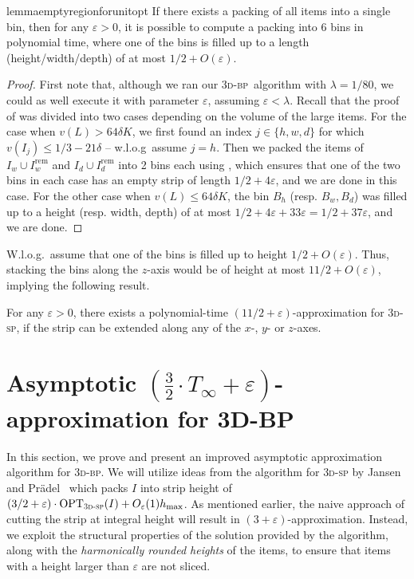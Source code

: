 \documentclass[a4paper,UKenglish,cleveref, autoref, thm-restate]{lipics-v2021}
\newcommand{\eps}{\varepsilon}
\newcommand{\opt}{\mathrm{OPT}}
\newcommand{\tbp}{\textsc{3d-bp}\xspace}
\newcommand{\tsp}{\textsc{3d-sp}\xspace}
\begin{document}
\begin{restatable}{lemma}{emptyregionforunitopt}
\label{lem:emptyregionforunitopt}
    If there exists a packing of all items into a single bin, then for any $\varepsilon >0$, it is possible to compute a packing into 6 bins in polynomial time, where one of the bins is filled up to a length (height/width/depth) of at most $1/2+O(\varepsilon)$.
\end{restatable}
\begin{proof}
    First note that, although we ran our \tbp~algorithm with $\lambda = 1/80$, we could as well execute it with parameter $\eps$, assuming $\eps < \lambda$. Recall that the proof of  was divided into two cases depending on the volume of the large items. For the case when $v(L)>64\delta K$, we first found an index $j\in \{h,w,d\}$ for which $v(I_j) \le 1/3-21\delta$ -- w.l.o.g~assume $j=h$. Then we packed the items of $I_w \cup I_w^{\text{rem}}$ and $I_d \cup I_d^{\text{rem}}$ into 2 bins each using , which ensures that one of the two bins in each case has an empty strip of length $1/2+4\eps$, and we are done in this case. For the other case when $v(L)\le 64\delta K$, the bin $B_h$ (resp. $B_w,B_d$) was filled up to a height (resp. width, depth) of at most $1/2+4\eps + 33\eps = 1/2 + 37\eps$, and we are done.
\end{proof}

W.l.o.g.~assume that one of the bins is filled up to height $1/2+O(\eps)$. Thus, stacking the bins along the $z$-axis would be of height at most $11/2+O(\eps)$, implying the following result.

\begin{corollary}
\label{cor:spwithdirection}
    For any $\varepsilon > 0$, there exists a polynomial-time $(11/2+\varepsilon)$-approximation for \tsp, if the strip can be extended along any of the $x$-, $y$- or $z$-axes.
\end{corollary}







\section{Asymptotic \texorpdfstring{$(\frac{3}{2}\cdot T_{\infty}+\eps)$}{near three-half}-approximation for 3D-BP}
\label{sec:asymptotic}

In this section, we prove  and present an improved asymptotic approximation algorithm for \tbp.  
We will utilize ideas from the algorithm for \tsp by Jansen and Prädel~\cite{3d-strip-packing} which  packs $I$ into strip height of $(3/2+\varepsilon) \cdot \opt_{\tsp}(I) + O_{\eps}(1)h_{\max}$.
As mentioned earlier, the naive approach of cutting the strip at integral height will result in  $(3+\eps)$-approximation. 
Instead, we exploit the structural properties of the solution provided by the algorithm, along with the {\em harmonically rounded heights} of the items, to ensure that items with a height larger than $\eps$ are not sliced.
\end{document}
